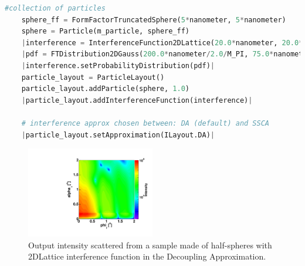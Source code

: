 \begin{lstlisting}[language=python, style=eclipseboxed,numbers=none,nolol,caption={\Code{Python} script to define a 2DLattice interference function between hemi-spherical particles as well as the Decoupling Approximation in \Code{getSimulation()}.  The part specific to the interferences is marked in a red italic font.},label={lst:2dlatticeinterf}]
    #collection of particles
    sphere_ff = FormFactorTruncatedSphere(5*nanometer, 5*nanometer)
    sphere = Particle(m_particle, sphere_ff)
    |interference = InterferenceFunction2DLattice(20.0*nanometer, 20.0*nanometer, 90.0*degree, 0.0*degree)|
    |pdf = FTDistribution2DGauss(200.0*nanometer/2.0/M_PI, 75.0*nanometer/2.0/M_PI)|
    |interference.setProbabilityDistribution(pdf)|
    particle_layout = ParticleLayout()
    particle_layout.addParticle(sphere, 1.0)
    |particle_layout.addInterferenceFunction(interference)|

    # interference approx chosen between: DA (default) and SSCA
    |particle_layout.setApproximation(ILayout.DA)|
\end{lstlisting}



\begin{figure}[tb]
\begin{center}
\includegraphics[angle=-90,width=0.5\textwidth]{fig/gisasmap/HSphere_2Dlattice.pdf}
\end{center}
\caption{Output intensity scattered from a sample made of half-spheres with 2DLattice interference function in the Decoupling Approximation.}
\label{fig:2dlatticeintensity}
\end{figure}

